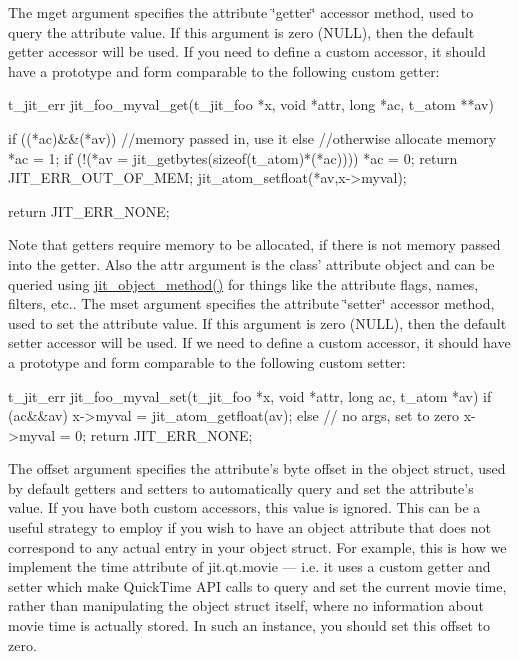 The mget argument specifies the attribute \char`\"{}getter\char`\"{} accessor method, used to query the attribute value. If this argument is zero (NULL), then the default getter accessor will be used. If you need to define a custom accessor, it should have a prototype and form comparable to the following custom getter:


\begin{DoxyCode}
t_jit_err jit_foo_myval_get(t_jit_foo *x, void *attr, long *ac, t_atom **av) 
{
   if ((*ac)&&(*av)) {
      //memory passed in, use it
   } else {
      //otherwise allocate memory
      *ac = 1;
      if (!(*av = jit_getbytes(sizeof(t_atom)*(*ac)))) {
         *ac = 0;
         return JIT_ERR_OUT_OF_MEM;
      }
   }
   jit_atom_setfloat(*av,x->myval);
   
   return JIT_ERR_NONE;
}
\end{DoxyCode}


Note that getters require memory to be allocated, if there is not memory passed into the getter. Also the attr argument is the class' attribute object and can be queried using \hyperlink{group__objectmod_ga9e1b9b8ed4fce611de26a74c6e1452c8}{jit\_\-object\_\-method()} for things like the attribute flags, names, filters, etc.. The mset argument specifies the attribute \char`\"{}setter\char`\"{} accessor method, used to set the attribute value. If this argument is zero (NULL), then the default setter accessor will be used. If we need to define a custom accessor, it should have a prototype and form comparable to the following custom setter:


\begin{DoxyCode}
t_jit_err jit_foo_myval_set(t_jit_foo *x, void *attr, long ac, t_atom *av) 
{
   if (ac&&av) {
      x->myval = jit_atom_getfloat(av);
   } else {
      // no args, set to zero
      x->myval = 0;
   }
   return JIT_ERR_NONE;
}
\end{DoxyCode}


The offset argument specifies the attribute's byte offset in the object struct, used by default getters and setters to automatically query and set the attribute's value. If you have both custom accessors, this value is ignored. This can be a useful strategy to employ if you wish to have an object attribute that does not correspond to any actual entry in your object struct. For example, this is how we implement the time attribute of jit.qt.movie — i.e. it uses a custom getter and setter which make QuickTime API calls to query and set the current movie time, rather than manipulating the object struct itself, where no information about movie time is actually stored. In such an instance, you should set this offset to zero.

